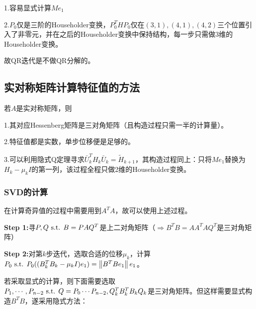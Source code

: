 \documentclass{ctexart}
\begin{document}
1.容易显式计算$Me_1$

2.$P_0$仅是三阶的Householder变换，$P_0^THP_0$仅在$(3,1),(4,1),(4,2)$三个位置引入了非零元，并在之后的Householder变换中保持结构，每一步只需做3维的Householder变换。 

\begin{Rmk}
故QR迭代是不做QR分解的。
\end{Rmk}


\subsection{实对称矩阵计算特征值的方法}
若$A$是实对称矩阵，则

1.其对应Hessenberg矩阵是三对角矩阵（且构造过程只需一半的计算量）。

2.特征值都是实数，单步位移便是足够的。

3.可以利用隐式Q定理寻求$\bar{U}_k^TH_k\bar U_k=\tilde{H}_{k+1}$，其构造过程同上：只将$Me_1$替换为$H_k-\mu_k I$的第一列，该过程全程只做2维的Householder变换。


\subsubsection{SVD的计算}
在计算奇异值的过程中需要用到$A^TA$，故可以使用上述过程。%

\textbf{Step 1:}寻$P,Q\text{ s.t. } B=PAQ^T$是上二对角矩阵（$\Rightarrow B^TB=AA^TAQ^T$是三对角矩阵）

\textbf{Step 2:}对第$k$步迭代，选取合适的位移$\mu_k$，计算$P_0\text{ s.t. } P_0((B_k^TB_k-\mu_k I)e_1)=\left\|B^TBe_1 \right\|e_1$。

若采取显式的计算，则下面需要选取$P_1,\cdots, P_{n-2}\text{ s.t. } Q=P_0\cdots P_{n-2},Q_k^TB_k^TB_kQ_k$是三对角矩阵。但这样需要显式构造$B^TB$，遂采用隐式方法：
\end{document}
